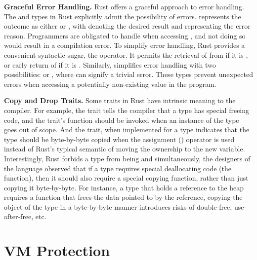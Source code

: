 \textbf{Graceful Error Handling.}
Rust offers a graceful approach to error handling.
The  and  types in Rust
explicitly admit the possibility of errors.
 represents the outcome as either  or ,
with  denoting the desired result
and  representing the error reason.
Programmers are obligated to handle  when accessing ,
and not doing so would result in a compilation error.
To simplify error handling,
Rust provides a convenient syntactic sugar,
the  operator.
It permits the retrieval of  from  if it is ,
or early return of  if it is .
Similarly,  simplifies error handling with two possibilities:
 or , where  can signify a trivial error.
These types prevent unexpected errors
when accessing a potentially non-existing value in the program.

\textbf{Copy and Drop Traits.}
Some traits in Rust have intrinsic meaning to the compiler. For example, the
 trait tells the compiler that a type has special freeing code, and
the  trait's  function should be invoked when an instance
of the type goes out of scope. And the  trait, when implemented for
a type indicates that the type should be byte-by-byte copied when the
assignment (\code{=}) operator is used instead of Rust's typical semantic
of moving the ownership to the new variable. Interestingly, Rust forbids a type
from being  and  simultaneously, the designers of the
language observed that if a type requires special deallocating code (the
 function), then it should also require a special copying function,
rather than just copying it byte-by-byte. For instance, a type that holds a
reference to the heap requires a  function that frees the data
pointed to by the reference, copying the object of the type in a byte-by-byte
manner introduces risks of double-free, use-after-free, etc.

\section{VM Protection}

